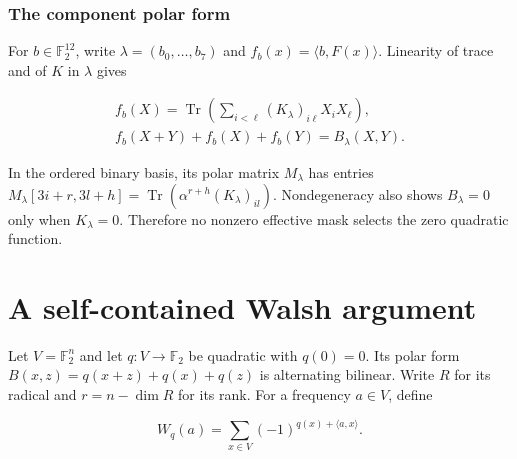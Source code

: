 \documentclass[11pt,a4paper]{article}
\newcommand{\F}{\mathbb F}
\DeclareMathOperator{\Tr}{Tr}
\theoremstyle{definition}
\begin{document}
\subsubsection*{The component polar form}

For $b\in \F_{2}^{12}$, write $\lambda =(b_{0},\ldots ,b_{7})$ and $f_{b}(x)=\langle b,F(x)\rangle $. Linearity of trace and of $K$ in $\lambda $ gives


\begin{equation}\label{eq:59}
\begin{gathered}f_b(X)=\Tr\!\left(\sum_{i<\ell}(K_\lambda)_{i\ell}X_iX_\ell\right),\\ f_b(X+Y)+f_b(X)+f_b(Y)=B_\lambda(X,Y).\end{gathered}
\end{equation}

In the ordered binary basis, its polar matrix $M_{\lambda }$ has entries $M_{\lambda }[3i+r,3l+h]=\operatorname{Tr}(\alpha ^{r+h}(K_{\lambda })_{il})$. Nondegeneracy also shows $B_{\lambda }=0$ only when $K_{\lambda }=0$. Therefore no nonzero effective mask selects the zero quadratic function.


\section{A self-contained Walsh argument}\label{sec:walsh}

Let $V=\F_{2}^{n}$ and let $q:V\to \F_{2}$ be quadratic with $q(0)=0$. Its polar form $B(x,z)=q(x+z)+q(x)+q(z)$ is alternating bilinear. Write $R$ for its radical and $r=n-\operatorname{dim} R$ for its rank. For a frequency $a\in V$, define


\begin{equation}\label{eq:63}
W_q(a)=\sum_{x\in V}(-1)^{q(x)+\langle a,x\rangle}.
\end{equation}
\end{document}
